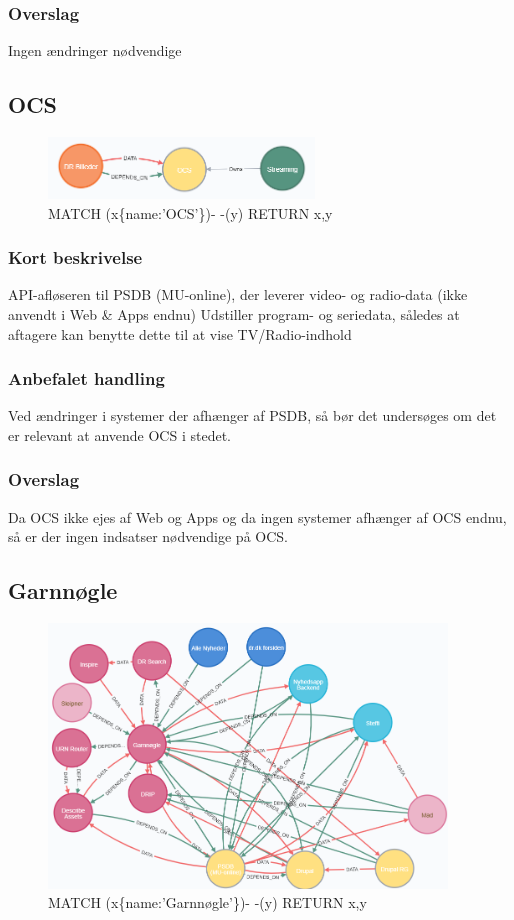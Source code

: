 \documentclass{article}
\begin{document}
\subsubsection{Overslag}
Ingen ændringer nødvendige


\subsection{OCS}
\begin{figure}[h]
\includegraphics[width=200pt]{OCS.PNG}
\caption{MATCH (x\{name:'OCS'\})- -(y) RETURN x,y}
\end{figure}
\subsubsection{Kort beskrivelse}
API-afløseren til PSDB (MU-online), der leverer video- og radio-data (ikke anvendt i Web \& Apps endnu)	Udstiller program- og seriedata, således at aftagere kan benytte dette til at vise TV/Radio-indhold
\subsubsection{Anbefalet handling}
Ved ændringer i systemer der afhænger af PSDB, så bør det undersøges om det er relevant at anvende OCS i stedet.
\subsubsection{Overslag}
Da OCS ikke ejes af Web og Apps og da ingen systemer afhænger af OCS endnu, så er der ingen indsatser nødvendige på OCS.


\subsection{Garnnøgle}
\begin{figure}[h]
\includegraphics[width=300pt]{Garnnoegle.PNG}
\caption{MATCH (x\{name:'Garnnøgle'\})- -(y) RETURN x,y}
\end{figure}
\end{document}
